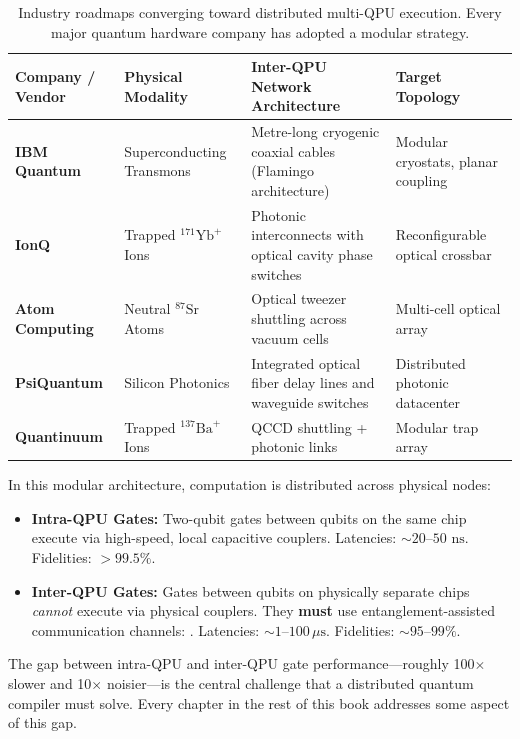 \begin{table}[htbp]
\centering
\small
\begin{tabularx}{\textwidth}{l X X X}
\toprule
\textbf{Company / Vendor} & \textbf{Physical Modality} & \textbf{Inter-QPU Network Architecture} & \textbf{Target Topology} \\
\midrule
\textbf{IBM Quantum} & Superconducting Transmons & Metre-long cryogenic coaxial cables (Flamingo architecture) & Modular cryostats, planar coupling \\
\addlinespace
\textbf{IonQ} & Trapped $^{171}\text{Yb}^+$ Ions & Photonic interconnects with optical cavity phase switches & Reconfigurable optical crossbar \\
\addlinespace
\textbf{Atom Computing} & Neutral $^{87}\text{Sr}$ Atoms & Optical tweezer shuttling across vacuum cells & Multi-cell optical array \\
\addlinespace
\textbf{PsiQuantum} & Silicon Photonics & Integrated optical fiber delay lines and waveguide switches & Distributed photonic datacenter \\
\addlinespace
\textbf{Quantinuum} & Trapped $^{137}\text{Ba}^+$ Ions & QCCD shuttling + photonic links & Modular trap array \\
\bottomrule
\end{tabularx}
\caption{Industry roadmaps converging toward distributed multi-QPU execution. Every major quantum hardware company has adopted a modular strategy.}
\label{tab:industry_roadmaps}
\end{table}

In this modular architecture, computation is distributed across physical nodes:

\begin{itemize}
    \item \textbf{Intra-QPU Gates:} Two-qubit gates between qubits on the same chip execute via high-speed, local capacitive couplers. Latencies: $\sim 20$--$50\text{ ns}$. Fidelities: $> 99.5\%$.
    \item \textbf{Inter-QPU Gates:} Gates between qubits on physically separate chips \textit{cannot} execute via physical couplers. They \textbf{must} use entanglement-assisted communication channels: . Latencies: $\sim 1$--$100\,\mu\text{s}$. Fidelities: $\sim 95$--$99\%$.
\end{itemize}

The gap between intra-QPU and inter-QPU gate performance---roughly 100$\times$ slower and 10$\times$ noisier---is the central challenge that a distributed quantum compiler must solve. Every chapter in the rest of this book addresses some aspect of this gap.

